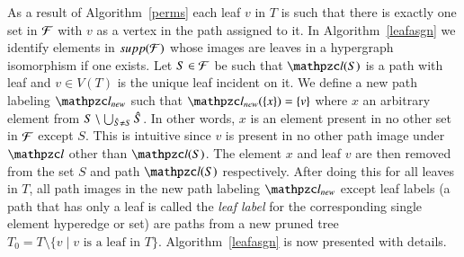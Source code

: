 \documentclass[MS,]{iitmdiss}
\begin{document}

As a result of Algorithm~\ref{perms} each leaf $v$ in $T$
is such that there is exactly one set in ${\cal F}$ with $v$ as a vertex in
the path assigned to it.  In Algorithm~\ref{leafasgn} we identify
elements in $supp({\cal F})$ whose images are leaves in a hypergraph
isomorphism if one exists.  Let $S \in {\cal F}$ be such that $\cl(S)$ is a
path with leaf and $v \in V(T)$ is the unique leaf incident on it.  We
define a new path labeling $\cl_{new}$ such that $\cl_{new}(\set{x}) =
\set{v}$ where $x$ an arbitrary element from $S \setminus \bigcup_{{\hat S}
  \ne S} {\hat S}$. In other words, $x$ is an element present in no other
set in ${\cal F}$ except $S$. This is intuitive since $v$ is present in no
other path image under $\cl$ other than $\cl(S)$.  The element $x$ and
leaf $v$ are then removed from the set $S$ and path $\cl(S)$
respectively. After doing this for all leaves in $T$, all path images
in the new path labeling $\cl_{new}$ except leaf labels (a path that
has only a leaf is called the {\em leaf label} for the corresponding
single element hyperedge or set) are paths from a new pruned tree $T_0
= T \setminus \{v \mid v \text{ is a leaf in }
T\}$. Algorithm~\ref{leafasgn} is now presented with details.
\end{document}
